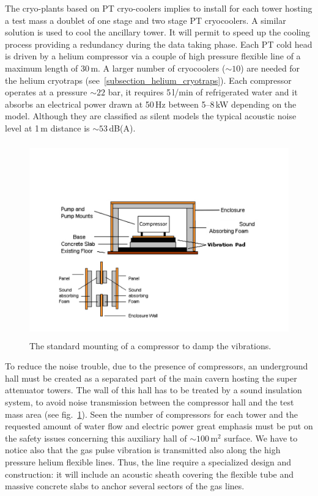 The  cryo-plants based on PT cryo-coolers implies to install for each tower hosting a test mass a doublet of one stage and two stage PT  cryocoolers. A similar solution is used  to cool the ancillary tower. It will permit to speed up the cooling process  providing  a redundancy during the data taking phase. 
Each PT cold head is driven by a  helium compressor via a couple of high pressure flexible line of a maximum length of 30\,m. 
A larger number of cryocoolers ($\sim 10$) are needed for the helium cryotraps (see~\ref{subsection_helium_cryotraps}).
Each compressor  operates at a pressure $\sim 22$ bar, it requires 5\,l/min of refrigerated water and it absorbs an electrical power drawn at 50\,Hz 
between 5--8\,kW depending on the model. Although they are classified as silent models the typical acoustic noise level at 1\,m distance is $\sim 53$\,dB(A).   
\begin{figure}[htbp]
\begin{center}
\includegraphics[width=12cm, height=8.4cm]{./Sec_SiteInfra/Figures/compressor_mounting.pdf}
\caption{{The standard mounting of a compressor to damp the vibrations.}}
\label{fig:compressor_mounting}
\end{center}
\end{figure}
To reduce the noise trouble, due to the presence of compressors, an underground hall must  be created as a separated part of the main cavern hosting the super attenuator towers.  The wall of this hall has to be treated by a sound insulation system, to avoid noise transmission between the compressor hall and the test mass area (see fig.~\ref{fig:compressor_mounting}). Seen the  number of compressors for each tower and the requested amount   of water flow and electric power  great emphasis must be put on the safety  issues  concerning this auxiliary hall of  $\sim 100\,\mathrm{m^2}$   surface.
We have to notice also that the gas pulse vibration is transmitted also   along  the high pressure helium flexible lines. Thus,  the  line require a specialized design and construction:   it will include  an acoustic sheath covering the flexible tube and massive  concrete slabs to anchor several sectors of the gas lines.


